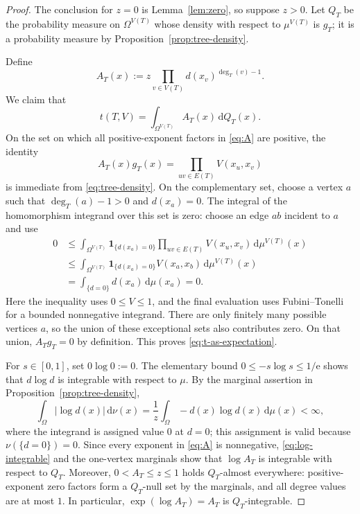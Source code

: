 \documentclass[11pt]{article}
\newcommand{\dd}{\,\mathrm{d}}
\newcommand{\one}{\mathbf{1}}
\begin{document}
\begin{proof}
The conclusion for $z=0$ is Lemma~\ref{lem:zero}, so suppose $z>0$.
Let $Q_T$ be the probability measure on $\Omega^{V(T)}$ whose density
with respect to $\mu^{V(T)}$ is $g_T$; it is a probability measure by
Proposition~\ref{prop:tree-density}.

Define
\begin{equation}
A_T(x):=z\prod_{v\in V(T)}d(x_v)^{\deg_T(v)-1}.
\label{eq:A}
\end{equation}
We claim that
\begin{equation}
t(T,V)=\int_{\Omega^{V(T)}}A_T(x)\dd Q_T(x).
\label{eq:t-as-expectation}
\end{equation}
On the set on which all positive-exponent factors in \eqref{eq:A} are
positive, the identity
\[
A_T(x)g_T(x)=\prod_{uv\in E(T)}V(x_u,x_v)
\]
is immediate from \eqref{eq:tree-density}.  On the complementary set,
choose a vertex $a$ such that $\deg_T(a)-1>0$ and $d(x_a)=0$.  The
integral of the homomorphism integrand over this set is zero: choose an
edge $ab$ incident to $a$ and use
\begin{align*}
0
&\leq
\int_{\Omega^{V(T)}}
\one_{\{d(x_a)=0\}}
\prod_{uv\in E(T)}V(x_u,x_v)\dd\mu^{V(T)}(x)
\\
&\leq
\int_{\Omega^{V(T)}}
\one_{\{d(x_a)=0\}}V(x_a,x_b)\dd\mu^{V(T)}(x)
\\
&=\int_{\{d=0\}}d(x_a)\dd\mu(x_a)=0.
\end{align*}
Here the inequality uses $0\leq V\leq1$, and the final evaluation uses
Fubini--Tonelli for a bounded nonnegative integrand.  There are only
finitely many possible vertices $a$, so the union of these exceptional
sets also contributes zero.  On that union, $A_Tg_T=0$ by definition.
This proves \eqref{eq:t-as-expectation}.

For $s\in[0,1]$, set $0\log0:=0$.  The elementary bound
$0\leq-s\log s\leq1/\mathrm{e}$ shows that $d\log d$ is integrable with
respect to $\mu$.  By the marginal assertion in
Proposition~\ref{prop:tree-density},
\begin{equation}
\int_\Omega |\log d(x)|\dd\nu(x)
=\frac1z\int_\Omega -d(x)\log d(x)\dd\mu(x)
<\infty,
\label{eq:log-integrable}
\end{equation}
where the integrand is assigned value $0$ at $d=0$; this assignment is
valid because $\nu(\{d=0\})=0$.  Since every exponent in
\eqref{eq:A} is nonnegative, \eqref{eq:log-integrable} and the
one-vertex marginals show that $\log A_T$ is integrable with respect to
$Q_T$.  Moreover, $0<A_T\leq z\leq1$ holds $Q_T$-almost everywhere:
positive-exponent zero factors form a $Q_T$-null set by the marginals,
and all degree values are at most $1$.  In particular,
$\exp(\log A_T)=A_T$ is $Q_T$-integrable.


\end{proof}
\end{document}
